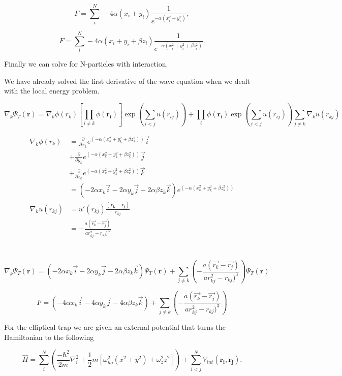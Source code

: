 $$F = \sum_i^N -4\alpha (x_i + y_i) \frac{1}{e^{-\alpha (x_i^2 + y_i^2)}},$$

$$F = \sum_i^N -4\alpha (x_i + y_i + \beta z_i) \frac{1}{e^{-\alpha (x_i^2 + y_i^2 + \beta z_i^2)}}.$$

Finally we can solve for N-particles with interaction.

We have already solved the first derivative of the wave equation when we dealt with the local energy problem.

$$\nabla_k \Psi_T(\mathbf{r}) = \nabla_k \phi(r_k) \left[\prod_{i\ne k} \phi(\mathbf{r_i})\right] \exp \left(\sum_{i<j}u(r_{ij})\right) +  \prod_{i} \phi (\mathbf{r_i}) \exp \left(\sum_{i<j}u(r_{ij})\right) \sum_{j\ne k} \nabla_k u(r_{kj})$$

\begin{align*}
\nabla_k \phi(r_k) &= \frac{\partial}{\partial x_k} e^{(-\alpha (x_k^2 + y_k^2 + \beta z_k^2))} \vec{i} \\
&+ \frac{\partial}{\partial y_k} e^{(-\alpha (x_k^2 + y_k^2 + \beta z_k^2))} \vec{j} \\
&+ \frac{\partial}{\partial z_k} e^{(-\alpha (x_k^2 + y_k^2 + \beta z_k^2))} \vec{k} \\
&= (-2\alpha x_k \vec{i} -2\alpha y_k \vec{j} -2\alpha \beta z_k \vec{k}) e^{(-\alpha (x_k^2 + y_k^2 + \beta z_k^2))}\\
\nabla_k u(r_{kj}) &= u'(r_{kj}) \frac{(\mathbf{r_k} - \mathbf{r_j})}{r_{kj}}\\
&= - \frac{a(\vec{r_k} - \vec{r_j})}{ar_{kj}^2 - r_{kj})^3}
\end{align*}
\\
\\

$$\nabla_k \Psi_T(\mathbf{r}) = (-2\alpha x_k \vec{i} - 2\alpha y_k \vec{j} - 2\alpha \beta z_k \vec{k}) \Psi_T(\mathbf{r})  + \sum_{j \ne k} \left( - \frac{a(\vec{r_k} - \vec{r_j})}{ar_{kj}^2 - r_{kj})^3} \right)\Psi_T(\mathbf{r})$$

$$F = (-4\alpha x_k \vec{i} - 4\alpha y_k \vec{j} - 4\alpha \beta z_k \vec{k}) + \sum_{j \ne k} \left( - \frac{a(\vec{r_k} - \vec{r_j})}{ar_{kj}^2 - r_{kj})^3} \right)$$

For the elliptical trap we are given an external potential that turns the Hamiltonian to the following

$$\hat{H} = \sum_{i}^{N} \left( \frac{-\hbar^2}{2m} \nabla_i^2 + \frac{1}{2} m [\omega_{ho}^2(x^2+ y^2) + \omega_z^2 z^2] \right) + \sum_{i<j}^{N} V_{int}(\mathbf{r_i}, \mathbf{r_j}).$$

